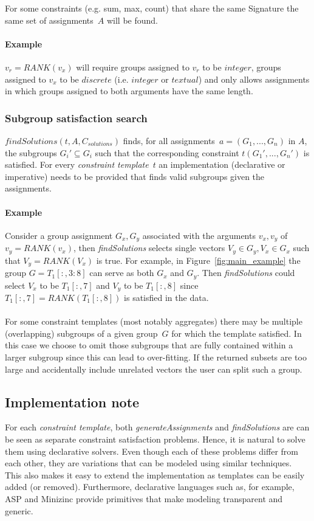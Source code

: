 \documentclass{ecai}
\newcommand{\format}[1]{\textit{#1}\xspace}
\newcommand{\generategroups}{\format{generateAssignments}}
\newcommand{\findassignment}{\format{findSolutions}}
\newcommand{\template}{\format{constraint template}}
\newcommand{\CSignature}{Signature\xspace}
\newcommand{\range}[3]{\ensuremath{#1[#2,#3]}}
\newcommand{\rangeto}[2]{#1{:}#2}
\newcommand{\rangeall}{:}
\newcommand{\eccalc}[2]{\ensuremath{#1 = #2}}
\newcommand{\ecrank}[2]{\eccalc{#1}{\mathit{RANK}(#2)}}
\newcommand{\textual}{\format{textual}}
\newcommand{\integer}{\format{integer}}
\newcommand{\discrete}{\format{discrete}}
\begin{document}
For some constraints (e.g. sum, max, count) that share the same \CSignature the same set of assignments~$A$ will be found.

\paragraph{Example}
\ecrank{v_r}{v_x} will require groups assigned to $v_r$ to be $\integer$, groups assigned to $v_x$ to be $\discrete$ (i.e. $\integer$ or $\textual$) and only allows assignments in which groups assigned to both arguments have the same length.

\subsubsection{Subgroup satisfaction search}
$\findassignment(t,A,C_{solutions})$ finds, for all assignments~$a = (G_1, ..., G_n)$ in $A$, the subgroups $G_i' \subseteq G_i$ such that the corresponding constraint $t(G_1', ..., G_n')$ is satisfied.
For every \template~$t$ an implementation (declarative or imperative) needs to be provided that finds valid subgroups given the assignments.

\paragraph{Example}
Consider a group assignment $G_x, G_y$ associated with the arguments $v_x,v_y$ of \ecrank{v_y}{v_x}, then \findassignment selects single vectors $V_y \in G_y, V_x \in G_x$ such that \ecrank{V_y}{V_x} is true.
For example, in Figure~\ref{fig:main_example} the group $G = \range{T_1}{\rangeall}{\rangeto{3}{8}}$ can serve as both $G_x$ and $G_y$.
Then \findassignment could select $V_x$ to be $\range{T_1}{\rangeall}{7}$ and $V_y$ to be $\range{T_1}{\rangeall}{8}$ since \ecrank{\range{T_1}{\rangeall}{7}}{\range{T_1}{\rangeall}{8}} is satisfied in the data.
\\\\
For some constraint templates (most notably aggregates) there may be multiple (overlapping) subgroups of a given group~$G$ for which the template satisfied.
In this case we choose to omit those subgroups that are fully contained within a larger subgroup since this can lead to over-fitting.
If the returned subsets are too large and accidentally include unrelated vectors the user can split such a group.

\subsection{Implementation note}
For each \template, both \generategroups and \findassignment are can be seen as separate constraint satisfaction problems.
Hence, it is natural to solve them using declarative solvers.
Even though each of these problems differ from each other, they are variations that can be modeled using similar techniques.
This also makes it easy to extend the implementation as templates can be easily added (or removed).
Furthermore, declarative languages such as, for example, ASP \cite{whaisasp} and Minizinc \cite{minizinc} provide primitives that make modeling transparent and generic.
\end{document}
